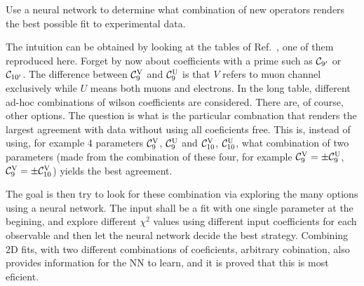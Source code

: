 \documentclass[11pt,amsmath,amssymb]{article}
\newcommand{\Cc}[1]{{\cal C}_{#1}}
\begin{document}
Use a neural network to determine what combination of new operators renders the best possible fit to experimental data.

The intuition can be obtained by looking at the tables of Ref.~\cite{Alguero:2019ptt}, one of them reproduced here.
Forget by now about coefficients with a prime such as $\Cc{9'}$ or $\Cc{10'}$. The difference between $\Cc{9}^{\rm V}$ and $\Cc{9}^{\rm U}$
is that $V$ refers to muon channel exclusively while $U$ means both muons and electrons.
In the long table, different ad-hoc combinations of wilson coefficients are considered. There are, of course, other options. The question is what
is the particular combnation that renders the largest agreement with data without using all coeficients free. This is, instead of using, for example
4 parameters $\Cc{9}^{\rm V}$, $\Cc{9}^{\rm U}$ and $\Cc{10}^{\rm V}$, $\Cc{10}^{\rm U}$, what combination of two parameters (made from the
combination of these four, for example $\Cc{9}^{\rm V} = \pm \Cc{9}^{\rm U}$, $\Cc{9}^{\rm V} = \pm \Cc{10}^{\rm V}$) yields the best agreement.

The goal is then try to look for these combination via exploring the many options using a neural network. The input shall be a fit with one single
parameter at the begining, and explore different $\chi^2$ values using different input coefficients for each observable and then let the neural
network decide the best strategy. Combining 2D fits, with two different combinations of coeficients, arbitrary cobination, also provides information
for the NN to learn, and it is proved that this is most eficient.
\end{document}
